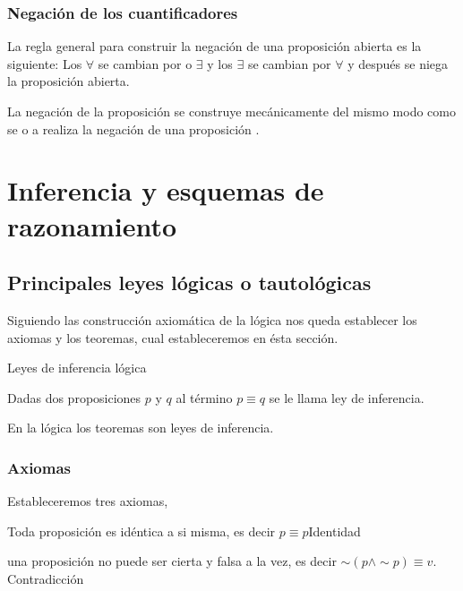 \subsubsection{Negación de los cuantificadores}

La regla general para construir la negación de una proposición abierta
es la siguiente: Los $\forall$ se cambian por o $\exists$ y los
$\exists$ se cambian por \foreignlanguage{english}{$\forall$} y
después se niega la proposición abierta. 

La negación de la proposición se construye mecánicamente del mismo
modo como se o a realiza la negación de una proposición . 


\section{Inferencia y esquemas de razonamiento}


\subsection{Principales leyes lógicas o tautológicas}

Siguiendo las construcción axiomática de la lógica nos queda establecer
los axiomas y los teoremas, cual estableceremos en ésta sección. 

\begin{ideas}{Leyes de inferencia lógica}

Dadas dos proposiciones $p$ y $q$ al término $p\equiv q$ se le
llama ley de inferencia.

\end{ideas}

En la lógica los teoremas son leyes de inferencia.


\subsubsection{Axiomas}

Estableceremos tres axiomas,

\begin{axioma}{ Toda proposición es idéntica a si misma, es decir
$p\equiv p$}{Identidad}\end{axioma}

\begin{axioma}{ una proposición no puede ser cierta y falsa a la
vez, es decir $\sim\left(p\wedge\sim p\right)\equiv v.$}{Contradicción}\end{axioma}

